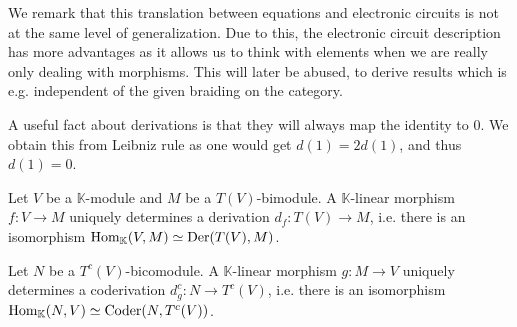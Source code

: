 \documentclass[../thesis.tex]{subfiles}
\begin{document}
\begin{definition}
\begin{center}
                \end{center}
            \end{definition}

            We remark that this translation between equations and electronic circuits is not at the same level of generalization. Due to this, the electronic circuit description has more advantages as it allows us to think with elements when we are really only dealing with morphisms. This will later be abused, to derive results which is e.g. independent of the given braiding on the category.

            A useful fact about derivations is that they will always map the identity to $0$. We obtain this from Leibniz rule as one would get $d(1) = 2d(1)$, and thus $d(1) = 0$.

            \begin{proposition}\label{prop: tensor-derivation}
                Let $V$ be a $\mathbb{K}$-module and $M$ be a $T(V)$-bimodule. A $\mathbb{K}$-linear morphism $f:V\rightarrow M$ uniquely determines a derivation $d_f:T(V)\rightarrow M$, i.e. there is an isomorphism $\tt{Hom}_{\mathbb{K}}(V,M)\simeq \tt{Der}(T(V),M)$.


                Let $N$ be a $T^c(V)$-bicomodule. A $\mathbb{K}$-linear morphism $g:M\rightarrow V$ uniquely determines a coderivation $d_g^c:N\rightarrow T^c(V)$, i.e. there is an isomorphism $\tt{Hom}_{\mathbb{K}}(N,V)\simeq \tt{Coder}(N,T^c(V))$.
            \end{proposition}
\end{document}
